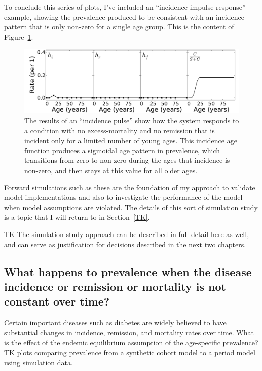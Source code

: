 To conclude this series of plots, I've included an ``incidence impulse
response'' example, showing the prevalence produced to be consistent
with an incidence pattern that is only non-zero for a single age
group. This is the content of
Figure~\ref{forward-sim-incidence-pluse}.

\begin{figure}[h]
\begin{center}

\includegraphics[width=\textwidth]{forward-sim-incidence_pulse.pdf}

\caption{The results of an ``incidence pulse'' show how the system
  responds to a condition with no excess-mortality and no remission
  that is incident only for a limited number of young ages.  This
  incidence age function produces a sigmoidal age pattern in
  prevalence, which transitions from zero to non-zero during the ages
  that incidence is non-zero, and then stays at this value for all
  older ages.}
\label{forward-sim-incidence-pluse}
\end{center}
\end{figure}



Forward simulations such as these are the foundation of my approach to
validate model implementations and also to investigate the performance
of the model when model assumptions are violated. The details of this
sort of simulation study is a topic that I will return to in
Section~\ref{TK}.

TK The simulation study approach can be described in full detail here
as well, and can serve as justification for decisions described in the
next two chapters.

\subsection{What happens to prevalence when the disease incidence or remission or mortality is not constant over time?}

Certain important diseases such as diabetes are widely believed to
have substantial changes in incidence, remission, and mortality rates
over time.  What is the effect of the endemic equilibrium assumption
of the age-specific prevalence? TK plots comparing prevalence from a
synthetic cohort model to a period model using simulation data.

